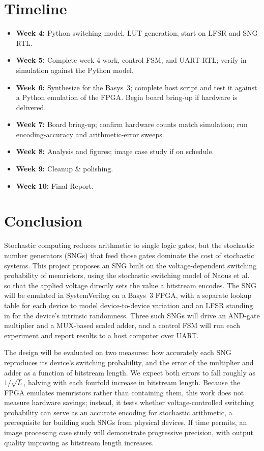 \documentclass[conference]{IEEEtran}
\begin{document}
\newpage
\section{Timeline}
\begin{itemize}
  \item \textbf{Week 4:} Python switching model, LUT generation, start on  LFSR 
      and SNG RTL.
  \item \textbf{Week 5:} Complete week 4 work, control FSM, and UART RTL;
        verify in simulation against the Python model.
  \item \textbf{Week 6:} Synthesize for the Basys~3; complete host script
        and test it against a Python emulation of the FPGA. Begin board
        bring-up if hardware is delivered.
  \item \textbf{Week 7:} Board bring-up; confirm hardware counts match
        simulation; run encoding-accuracy and arithmetic-error sweeps.
  \item \textbf{Week 8:} Analysis and figures; image case study if on
        schedule.
    \item \textbf{Week 9:} Cleanup \& polishing.
    \item \textbf{Week 10:} Final Report.
\end{itemize}

\section{Conclusion}
Stochastic computing reduces arithmetic to single logic gates, but the
stochastic number generators (SNGs) that feed those gates dominate the cost
of stochastic systems. This project proposes an SNG built on the
voltage-dependent switching probability of memristors, using the stochastic
switching model of Naous et al.~\cite{memristor_stochasticity} so that the
applied voltage directly sets the value a bitstream encodes. The SNG will be
emulated in SystemVerilog on a Basys~3 FPGA, with a separate lookup table
for each device to model device-to-device variation and an LFSR standing in
for the device's intrinsic randomness. Three such SNGs will drive an
AND-gate multiplier and a MUX-based scaled adder, and a control FSM will run
each experiment and report results to a host computer over UART.

The design will be evaluated on two measures: how accurately each SNG
reproduces its device's switching probability, and the error of the
multiplier and adder as a function of bitstream length. We expect both
errors to fall roughly as $1/\sqrt{L}$, halving with each fourfold increase
in bitstream length. Because the FPGA emulates memristors rather than
containing them, this work does not measure hardware savings; instead, it
tests whether voltage-controlled switching probability can serve as an
accurate encoding for stochastic arithmetic, a prerequisite for building
such SNGs from physical devices. If time permits, an image processing case
study will demonstrate progressive precision, with output quality improving
as bitstream length increases.
\end{document}
